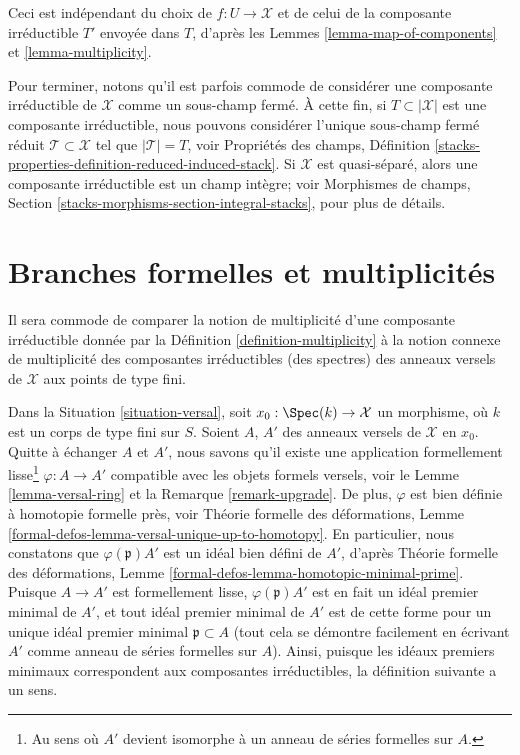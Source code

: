 \noindent
Ceci est indépendant du choix de $f : U \to \mathcal{X}$
et de celui de la composante irréductible $T'$ envoyée dans $T$,
d'après les Lemmes \ref{lemma-map-of-components} et \ref{lemma-multiplicity}.

\medskip\noindent
Pour terminer, notons qu'il est parfois commode de considérer
une composante irréductible de $\mathcal{X}$ comme un sous-champ fermé.
À cette fin, si $T \subset |\mathcal{X}|$ est une composante irréductible,
nous pouvons considérer l'unique sous-champ fermé réduit
$\mathcal{T} \subset \mathcal{X}$ tel que $|\mathcal{T}| = T$, voir
Propriétés des champs, Définition
\ref{stacks-properties-definition-reduced-induced-stack}.
Si $\mathcal{X}$ est quasi-séparé, alors
une composante irréductible est un champ intègre; voir
Morphismes de champs, Section \ref{stacks-morphisms-section-integral-stacks},
pour plus de détails.



\section{Branches formelles et multiplicités}
\label{section-formal-branches}

\noindent
Il sera commode de comparer la notion de multiplicité
d'une composante irréductible donnée par la Définition \ref{definition-multiplicity}
à la notion connexe de multiplicité des composantes irréductibles
(des spectres) des anneaux versels de $\mathcal{X}$ aux points de type fini.

\medskip\noindent
Dans la Situation \ref{situation-versal}, soit $x_0 : \Spec(k) \to \mathcal{X}$
un morphisme, où $k$ est un corps de type fini sur $S$.
Soient $A$, $A'$ des anneaux versels de $\mathcal{X}$ en $x_0$.
Quitte à échanger $A$ et $A'$, nous savons qu'il existe une application
formellement lisse\footnote{Au sens où
$A'$ devient isomorphe à un anneau de séries formelles sur $A$.}
$\varphi : A \to A'$ compatible avec les objets formels versels, voir le
Lemme \ref{lemma-versal-ring} et la
Remarque \ref{remark-upgrade}.
De plus, $\varphi$ est bien définie à homotopie formelle près, voir
Théorie formelle des déformations, Lemme
\ref{formal-defos-lemma-versal-unique-up-to-homotopy}.
En particulier, nous constatons que $\varphi(\mathfrak p)A'$ est un idéal
bien défini de $A'$, d'après
Théorie formelle des déformations, Lemme
\ref{formal-defos-lemma-homotopic-minimal-prime}.
Puisque $A \to A'$ est formellement lisse,
$\varphi(\mathfrak p)A'$ est en fait un idéal premier minimal de $A'$,
et tout idéal premier minimal de $A'$ est de cette forme pour
un unique idéal premier minimal $\mathfrak p \subset A$ (tout cela
se démontre facilement en écrivant $A'$ comme anneau de séries formelles sur $A$).
Ainsi, puisque les idéaux premiers minimaux correspondent
aux composantes irréductibles, la définition suivante a un sens.

